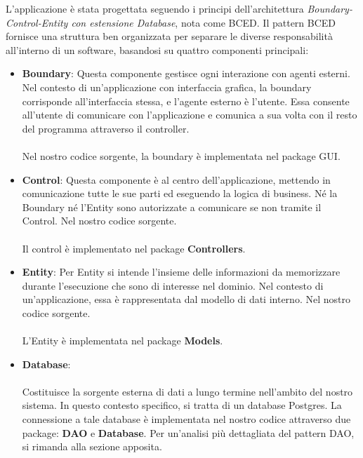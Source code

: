 \documentclass{article}
\begin{document}
{		L'applicazione è stata progettata seguendo i principi dell'architettura {\itshape {Boundary-Control-Entity con estensione Database}}, nota come BCED. Il pattern BCED fornisce una struttura ben organizzata per separare le diverse responsabilità all'interno di un software, basandosi su quattro componenti principali:
		
		\begin{itemize}
			\item \textbf{Boundary}: Questa componente gestisce ogni interazione con agenti esterni. Nel contesto di un'applicazione con interfaccia grafica, la boundary corrisponde all'interfaccia stessa, e l'agente esterno è l'utente. Essa consente all'utente di comunicare con l'applicazione e comunica a sua volta con il resto del programma attraverso il controller.
			 \\\\
			 Nel nostro codice sorgente, la boundary è implementata nel package GUI.
			 
			 \item \textbf{Control}: Questa componente è al centro dell'applicazione, mettendo in comunicazione tutte le sue parti ed eseguendo la logica di business. Né la Boundary né l'Entity sono autorizzate a comunicare se non tramite il Control. Nel nostro codice sorgente.
			 \\\\
			 Il control è implementato nel package \textbf{Controllers}.
			 
			 \item \textbf{Entity}: Per Entity si intende l'insieme delle informazioni da memorizzare durante l'esecuzione che sono di interesse nel dominio. Nel contesto di un'applicazione, essa è rappresentata dal modello di dati interno. Nel nostro codice sorgente.
			 \\\\
			 L'Entity è implementata nel package \textbf{Models}.
			 
			 \item \textbf{Database}:  \\\\
			 Costituisce la sorgente esterna di dati a lungo termine nell'ambito del nostro sistema. In questo contesto specifico, si tratta di un database Postgres. La connessione a tale database è implementata nel nostro codice attraverso due package: \textbf{DAO} e \textbf{Database}. Per un'analisi più dettagliata del pattern DAO, si rimanda alla sezione apposita.
		\end{itemize}
		
}
\end{document}
